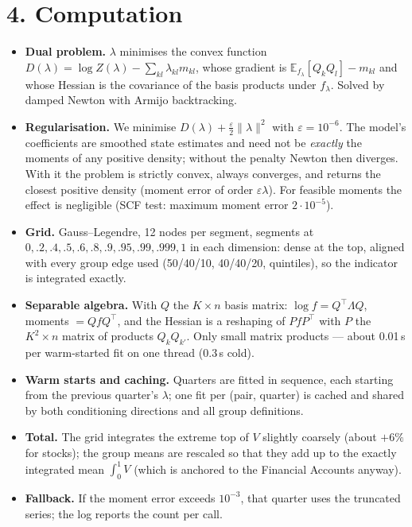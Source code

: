 \documentclass[11pt]{article}
\newcommand{\E}{\mathbb{E}}
\begin{document}
\section*{4. Computation}
\begin{itemize}
\item \textbf{Dual problem.} $\lambda$ minimises the convex function $D(\lambda)=\log Z(\lambda)-\sum_{kl}\lambda_{kl}m_{kl}$, whose gradient is $\E_{f_\lambda}[Q_kQ_l]-m_{kl}$ and whose Hessian is the covariance of the basis products under $f_\lambda$. Solved by damped Newton with Armijo backtracking.
\item \textbf{Regularisation.} We minimise $D(\lambda)+\tfrac{\varepsilon}{2}\|\lambda\|^2$ with $\varepsilon=10^{-6}$. The model's coefficients are smoothed state estimates and need not be \emph{exactly} the moments of any positive density; without the penalty Newton then diverges. With it the problem is strictly convex, always converges, and returns the closest positive density (moment error of order $\varepsilon\lambda$). For feasible moments the effect is negligible (SCF test: maximum moment error $2\cdot10^{-5}$).
\item \textbf{Grid.} Gauss--Legendre, 12 nodes per segment, segments at $0, .2, .4, .5, .6, .8, .9, .95, .99, .999, 1$ in each dimension: dense at the top, aligned with every group edge used (50/40/10, 40/40/20, quintiles), so the indicator is integrated exactly.
\item \textbf{Separable algebra.} With $Q$ the $K\times n$ basis matrix: $\log f = Q^\top\Lambda Q$, moments $=QfQ^\top$, and the Hessian is a reshaping of $PfP^\top$ with $P$ the $K^2\times n$ matrix of products $Q_kQ_{k'}$. Only small matrix products --- about 0.01\,s per warm-started fit on one thread (0.3\,s cold).
\item \textbf{Warm starts and caching.} Quarters are fitted in sequence, each starting from the previous quarter's $\lambda$; one fit per (pair, quarter) is cached and shared by both conditioning directions and all group definitions.
\item \textbf{Total.} The grid integrates the extreme top of $V$ slightly coarsely (about $+6\%$ for stocks); the group means are rescaled so that they add up to the exactly integrated mean $\int_0^1 V$ (which is anchored to the Financial Accounts anyway).
\item \textbf{Fallback.} If the moment error exceeds $10^{-3}$, that quarter uses the truncated series; the log reports the count per call.
\end{itemize}
\end{document}
